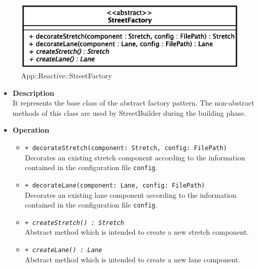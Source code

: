 \begin{figure}[h]
\centering
\includegraphics[scale=0.6,keepaspectratio]{images/solution/street_factory.eps}
\caption{App::Reactive::StreetFactory}
\label{fig:sd-app-street-factory}
\end{figure}
\FloatBarrier
\begin{itemize}
  \item \textbf{Description} \\
    It represents the base class of the abstract factory pattern. The 
non-abstract methods of this class are used by StreetBuilder during the
building phase.
  \item \textbf{Operation} \\
  \begin{itemize} 
    \item \texttt{+ decorateStretch(component: Stretch, config: FilePath)} \\
Decorates an existing stretch component according to the information contained
in the configuration file \texttt{config}.
    \item \texttt{+ decorateLane(component: Lane, config: FilePath)} \\
Decorates an existing lane component according to the information contained in
the configuration file \texttt{config}.
    \item \texttt{\textit{+ createStretch() : Stretch}} \\
Abstract method which is intended to create a new stretch component.
    \item \texttt{\textit{+ createLane() : Lane}} \\
Abstract method which is intended to create a new lane component.
  \end{itemize}
\end{itemize}
